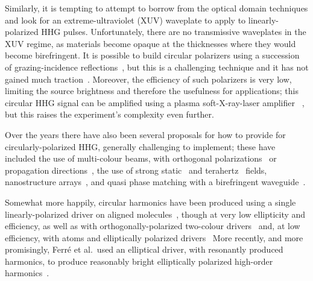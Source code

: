 Similarly, it is tempting to attempt to borrow from the optical domain techniques and look for an extreme-ultraviolet (XUV) waveplate to apply to linearly-polarized HHG pulses. Unfortunately, there are no transmissive waveplates in the XUV regime, as materials become opaque at the thicknesses where they would become birefringent. It is possible to build circular polarizers using a succession of grazing-incidence reflections~\cite{vodungbo_hhg-waveplate_2011}, but this is a challenging technique and it has not gained much traction~\cite{willems_hhg-waveplate_2015}. Moreover, the efficiency of such polarizers is very low, limiting the source brightness and therefore the usefulness for applications; this circular HHG signal can be amplified using a plasma soft-X-ray-laser amplifier~ \cite{depresseux_hhg-then-plasma-laser_2015}, but this raises the experiment's complexity even further.



Over the years there have also been several proposals for how to provide for circularly-polarized HHG, generally challenging to implement; these have included 
%
the use of multi-colour beams, with orthogonal polarizations~\cite{ruiz_elliptical-pulses-two-color_2009} 
%
or propagation directions~\cite{tong-chu_crossed-beam_1998, fleischer_linear-plus-elliptical-driver_2013}, 
%
the use of strong static~\cite{borca_static-field-circular-harmonics_2000}
%
and terahertz~\cite{yuan_elliptical-terahertz_2013} fields,
%
nanostructure arrays~\cite{husakou_circular-harmonics-nanostructures_2011}, 
%
and quasi phase matching with a birefringent waveguide~\cite{liu_circular-hhg-quasi-phase-matching_2012}. 



Somewhat more happily, circular harmonics have been produced using a single linearly-polarized driver on aligned molecules~\cite{zhou_aligned-molecules-elliptical-hhg_2009, mairesse_high-harmonic-spectroscopy_2010}, though at very low ellipticity and efficiency, 
%
as well as with or\-tho\-go\-na\-lly-polarized two-colour drivers~\cite{lambert_circular-hhg-cross-polarized_2015, stremoukhov_elliptical-harmonics_2016}
%
and, at low efficiency, with atoms and elliptically polarized drivers~\cite{ weihe_harmonics-polarization_1995, antoine_harmonics-polarization_1997, strelkov_harmonics-polarization-origin_2011}
%
More recently, and more promisingly, Ferré et al.\ used an elliptical driver, with resonantly produced harmonics, to produce reasonably bright elliptically polarized high-order harmonics~\cite{ferre_circular-harmonics_2015}.

